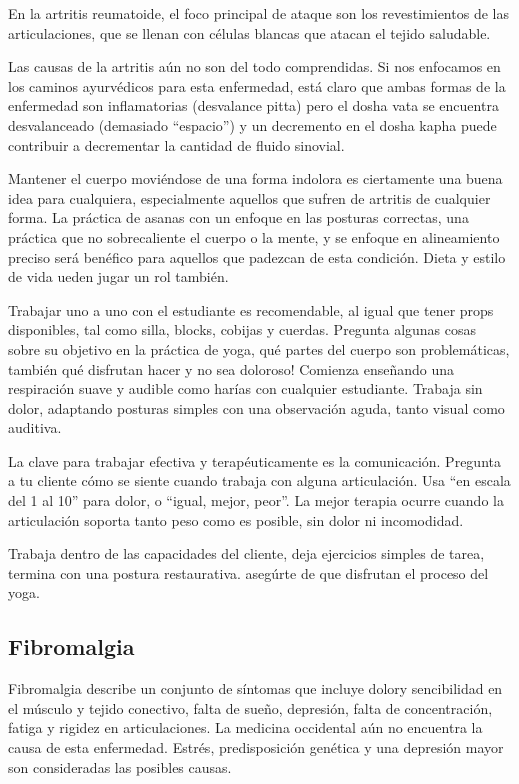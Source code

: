En la artritis reumatoide, el foco principal de ataque son los revestimientos de las articulaciones, que se llenan con c\'elulas blancas que atacan el tejido saludable.

Las causas de la artritis aún no son del todo comprendidas. Si nos enfocamos en los caminos ayurv\'edicos para esta enfermedad, está claro que ambas formas de la enfermedad son inflamatorias (desvalance pitta) pero el dosha vata se encuentra desvalanceado (demasiado ``espacio'') y un decremento en el dosha kapha puede contribuir a decrementar la cantidad de fluido sinovial.

Mantener el cuerpo movi\'endose de una forma indolora es ciertamente una buena idea para cualquiera, especialmente aquellos que sufren de artritis de cualquier forma. La práctica de asanas con un enfoque en las posturas correctas, una práctica que no sobrecaliente el cuerpo o la mente, y se enfoque en alineamiento preciso será ben\'efico para aquellos que padezcan de esta condición. Dieta y estilo de vida ueden jugar un rol tambi\'en.

Trabajar uno a uno con el estudiante es recomendable, al igual que tener props disponibles, tal como silla, blocks, cobijas y cuerdas. Pregunta algunas cosas sobre su objetivo en la práctica de yoga, qu\'e partes del cuerpo son problemáticas, tambi\'en qu\'e disfrutan hacer y no sea doloroso! Comienza enseñando una respiración suave y audible como harías con cualquier estudiante. Trabaja sin dolor, adaptando posturas simples con una observación aguda, tanto visual como auditiva.

La clave para trabajar efectiva y terap\'euticamente es la comunicación. Pregunta a tu cliente cómo se siente cuando trabaja con alguna articulación. Usa ``en escala del 1 al 10'' para dolor, o ``igual, mejor, peor''. La mejor terapia ocurre cuando la articulación soporta tanto peso como es posible, sin dolor ni incomodidad.

Trabaja dentro de las capacidades del cliente, deja ejercicios simples de tarea, termina con una postura restaurativa. asegúrte de que disfrutan el proceso del yoga.

\subsection{Fibromalgia}
Fibromalgia describe un conjunto de síntomas que incluye dolory sencibilidad en el músculo y tejido conectivo, falta de sueño, depresión, falta de concentración, fatiga y rigidez en articulaciones. La medicina occidental aún no encuentra la causa de esta enfermedad. Estr\'es, predisposición gen\'etica y una depresión mayor son consideradas las posibles causas.

